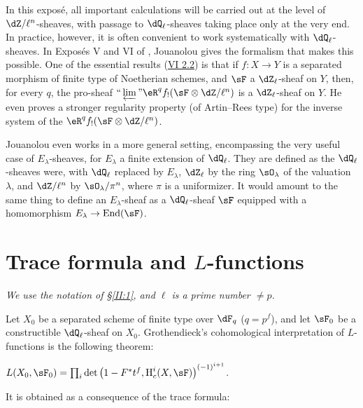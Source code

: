 In this exposé, all important calculations will be carried out at the level
of $\dZ/\ell^n$-sheaves, with passage to $\dQ_\ell$-sheaves taking place only
at the very end. In practice, however, it is often convenient to work
systematically with $\dQ_\ell$-sheaves. In Exposés V and VI of
\cite{sga5}, Jouanolou gives the formalism that makes this possible. One of
the essential results (\hyperref[VI:2-2]{VI 2.2}) is that if $f:X\to Y$ is a separated morphism
of finite type of Noetherian schemes, and $\sF$ a $\dZ_\ell$-sheaf on $Y$,
then, for every $q$, the pro-sheaf
$\text{``}\varprojlim\text{''}\eR^q f_! (\sF\otimes\dZ/\ell^n)$ is a
$\dZ_\ell$-sheaf on $Y$. He even proves a stronger regularity property (of
Artin--Rees type) for the inverse system of the
$\eR^q f_!(\sF\otimes\dZ/\ell^n)$.

Jouanolou even works in a more general setting, encompassing the very useful
case of $E_\lambda$-sheaves, for $E_\lambda$ a finite extension of
$\dQ_\ell$. They are defined as the $\dQ_\ell$-sheaves were, with
$\dQ_\ell$ replaced by $E_\lambda$, $\dZ_\ell$ by the ring $\sO_\lambda$ of
the valuation $\lambda$, and $\dZ/\ell^n$ by $\sO_\lambda/\pi^n$, where
$\pi$ is a uniformizer. It would amount to the same thing to define an
$E_\lambda$-sheaf as a $\dQ_\ell$-sheaf $\sF$ equipped with a homomorphism
$E_\lambda\to\operatorname{End}(\sF)$.









\section{Trace formula and \texorpdfstring{$L$}{L}-functions}\label{II:3}

\emph{We use the notation of \S\ref{II:1}, and $\ell$ is a prime number
$\ne p$.}

Let $X_0$ be a separated scheme of finite type over $\dF_q$ ($q=p^f$), and
let $\sF_0$ be a constructible $\dQ_\ell$-sheaf on $X_0$. Grothendieck's
cohomological interpretation of $L$-functions is the following theorem:






\begin{theorem_}\label{II:3-1}
$L(X_0,\sF_0) = \prod_i \det\left(1-F^* t^f, \h_c^i(X,\sF)\right)^{(-1)^{i+1}}$.
\end{theorem_}

It is obtained as a consequence of the trace formula:







